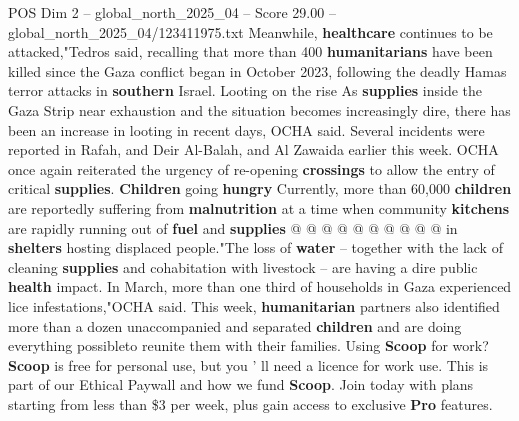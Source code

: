 \begin{textsample}{POS Dim 2 – global\_north\_2025\_04 – Score 29.00 – global\_north\_2025\_04/123411975.txt}
Meanwhile, \textbf{healthcare} continues to be attacked,"Tedros said, recalling that more than 400 \textbf{humanitarians} have been killed since the Gaza conflict began in October 2023, following the deadly Hamas terror attacks in \textbf{southern} Israel.
Looting on the rise As \textbf{supplies} inside the Gaza Strip near exhaustion and the situation becomes increasingly dire, there has been an increase in looting in recent days, OCHA said.
Several incidents were reported in Rafah, and Deir Al-Balah, and Al Zawaida earlier this week.
OCHA once again reiterated the urgency of re-opening \textbf{crossings} to allow the entry of critical \textbf{supplies}. \textbf{Children} going \textbf{hungry} Currently, more than 60,000 \textbf{children} are reportedly suffering from \textbf{malnutrition} at a time when community \textbf{kitchens} are rapidly running out of \textbf{fuel} and \textbf{supplies} @ @ @ @ @ @ @ @ @ @ in \textbf{shelters} hosting displaced people."The loss of \textbf{water} -- together with the lack of cleaning \textbf{supplies} and cohabitation with livestock -- are having a dire public \textbf{health} impact.
In March, more than one third of households in Gaza experienced lice infestations,"OCHA said.
This week, \textbf{humanitarian} partners also identified more than a dozen unaccompanied and separated \textbf{children} and are doing everything possibleto reunite them with their families.
Using \textbf{Scoop} for work? \textbf{Scoop} is free for personal use, but you ' ll need a licence for work use.
This is part of our Ethical Paywall and how we fund \textbf{Scoop}.
Join today with plans starting from less than \$3 per week, plus gain access to exclusive \textbf{Pro} features.

\end{textsample}
